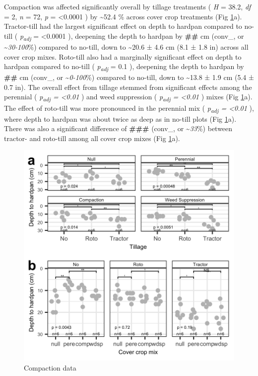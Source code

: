 \documentclass[
]{article}
\begin{document}
Compaction was affected significantly overall by tillage treatments (
\emph{H} = 38.2,
\emph{df} = 2,
\emph{n} = 72,
\emph{p} = \textless0.0001
) by
\textasciitilde52.4 \%
across cover crop treatments (Fig \ref{fig:compactFig}a).
Tractor-till had the largest significant effect on depth to hardpan compared to no-till (
\emph{p\textsubscript{adj}} = \textless0.0001
),
deepening the depth to hardpan by \textbf{\#\#} cm (conv\_, or \textasciitilde{}\emph{30-100}\%) compared to no-till,
down to
\textasciitilde20.6 ±
4.6 cm
(8.1 ±
1.8 in)
across all cover crop mixes.
Roto-till also had a marginally significant effect on depth to hardpan compared to no-till (
\emph{p\textsubscript{adj}} = 0.1
),
deepening the depth to hardpan by \textbf{\#\#} cm (conv\_, or \textasciitilde{}\emph{0-100}\%) compared to no-till, down to
\textasciitilde13.8 ±
1.9 cm
(5.4 ±
0.7 in).
The overall effect from tillage stemmed from significant effects among the perennial (
\emph{p\textsubscript{adj} = \textless0.01}
) and weed suppression (
\emph{p\textsubscript{adj} = \textless0.01}
) mixes (Fig \ref{fig:compactFig}a).
The effect of roto-till was more pronounced in the perennial mix (
\emph{p\textsubscript{adj} = \textless0.01}
), where depth to hardpan was about twice as deep as in no-till plots (Fig \ref{fig:compactFig}a).
There was also a significant difference of \textbf{\#\#\#} (conv\_, or \textasciitilde{}\emph{33}\%) between tractor- and roto-till among all cover crop mixes (Fig \ref{fig:compactFig}a).

\begin{figure}
\includegraphics[width=12.5in]{../figs/compactionPlot} \caption{Compaction data}\label{fig:compactFig}
\end{figure}
\end{document}
